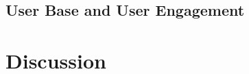 \documentclass[12pt, a4paper]{article}
\begin{document}


\subsection*{User Base and User Engagement}





\section{Discussion}








\end{document}
